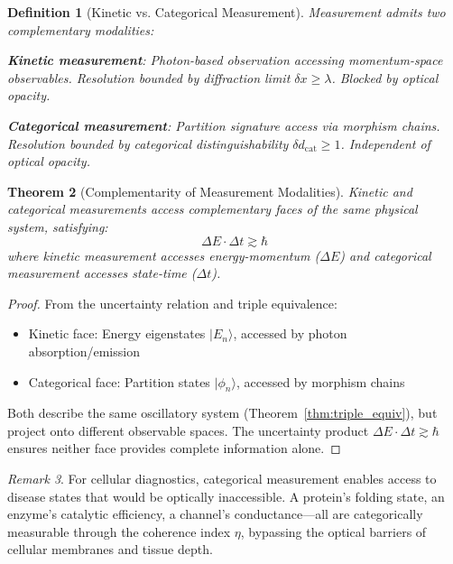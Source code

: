 \documentclass[aps,prd,twocolumn,superscriptaddress,floatfix,nofootinbib]{revtex4-2}
\newtheorem{theorem}{Theorem}[section]
\newtheorem{definition}[theorem]{Definition}
\theoremstyle{remark}
\newtheorem{remark}[theorem]{Remark}
\newcommand{\dcat}{d_{\mathrm{cat}}}
\begin{document}
\begin{definition}[Kinetic vs. Categorical Measurement]
\label{def:measurement_modalities}
Measurement admits two complementary modalities:

\textbf{Kinetic measurement}: Photon-based observation accessing momentum-space observables. Resolution bounded by diffraction limit $\delta x \geq \lambda$. Blocked by optical opacity.

\textbf{Categorical measurement}: Partition signature access via morphism chains. Resolution bounded by categorical distinguishability $\delta\dcat \geq 1$. Independent of optical opacity.
\end{definition}

\begin{theorem}[Complementarity of Measurement Modalities]
\label{thm:complementarity}
Kinetic and categorical measurements access complementary faces of the same physical system, satisfying:
\begin{equation}
\Delta E \cdot \Delta t \gtrsim \hbar
\end{equation}
where kinetic measurement accesses energy-momentum ($\Delta E$) and categorical measurement accesses state-time ($\Delta t$).
\end{theorem}

\begin{proof}
From the uncertainty relation and triple equivalence:
\begin{itemize}
\item Kinetic face: Energy eigenstates $|E_n\rangle$, accessed by photon absorption/emission
\item Categorical face: Partition states $|\phi_n\rangle$, accessed by morphism chains
\end{itemize}
Both describe the same oscillatory system (Theorem~\ref{thm:triple_equiv}), but project onto different observable spaces. The uncertainty product $\Delta E \cdot \Delta t \gtrsim \hbar$ ensures neither face provides complete information alone.
\end{proof}

\begin{remark}
For cellular diagnostics, categorical measurement enables access to disease states that would be optically inaccessible. A protein's folding state, an enzyme's catalytic efficiency, a channel's conductance---all are categorically measurable through the coherence index $\eta$, bypassing the optical barriers of cellular membranes and tissue depth.
\end{remark}
\end{document}
